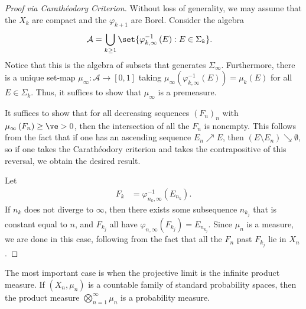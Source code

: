 \documentclass[10pt]{mypackage}
\begin{document}
\begin{proof}[Proof via Carathéodory Criterion]
  Without loss of generality, we may assume that the $X_k$ are compact and the $\varphi_{k+1}$ are Borel. Consider the algebra
  \begin{align*}
    \mathcal{A} &= \bigcup_{k\geq 1} \set{\varphi_{k,\infty}^{-1}\left( E \right) : E\in \Sigma_k}.
  \end{align*}
  Notice that this is the algebra of subsets that generates $\Sigma_{\infty}$. Furthermore, there is a unique set-map $\mu_{\infty}\colon \mathcal{A}\rightarrow [0,1]$ taking $\mu_{\infty}\left( \varphi_{k,\infty}^{-1}\left( E \right) \right) = \mu_k\left( E \right)$ for all $E\in \Sigma_k$. Thus, it suffices to show that $\mu_{\infty}$ is a premeasure.

  It suffices to show that for all decreasing sequences $\left( F_n \right)_n$ with $\mu_{\infty}\left( F_n \right)\geq \ve > 0$, then the intersection of all the $F_n$ is nonempty. This follows from the fact that if one has an ascending sequence $E_n\nearrow E$, then $\left( E\setminus E_n \right)\searrow \emptyset$, so if one takes the Carathéodory criterion and takes the contrapositive of this reversal, we obtain the desired result.

  Let
  \begin{align*}
    F_k &= \varphi_{n_k,\infty}^{-1} \left( E_{n_k} \right).
  \end{align*}
  If $n_k$ does not diverge to $\infty$, then there exists some subsequence $n_{k_j}$ that is constant equal to $n$, and $F_{k_j}$ all have $\varphi_{n,\infty}\left( F_{k_j} \right) = E_{n_{k_j}}$. Since $\mu_n$ is a measure, we are done in this case, following from the fact that all the $F_n$ past $F_{k_j}$ lie in $X_n$.
\end{proof}
The most important case is when the projective limit is the infinite product measure. If $\left( X_n,\mu_n \right)$ is a countable family of standard probability spaces, then the product measure $\bigotimes_{n=1}^{\infty}\mu_n$ is a probability measure.
\end{document}
